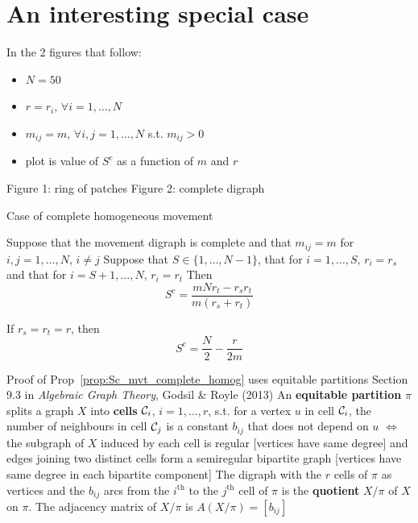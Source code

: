 \documentclass[aspectratio=169]{beamer}
\begin{document}
\section{An interesting special case}
\begin{frame}
	In the 2 figures that follow:
	\begin{itemize}
		\item $N=50$
		\item $r=r_i$, $\forall i=1,\ldots,N$
		\item $m_{ij}=m$, $\forall i,j=1,\ldots,N$ s.t. $m_{ij}>0$
		\item plot is value of $S^c$ as a function of $m$ and $r$
	\end{itemize}
	\vfill
	Figure 1: ring of patches
	\vfill
	Figure 2: complete digraph
\end{frame}



\begin{frame}{Case of complete homogeneous movement}
	\begin{proposition}\label{prop:Sc_mvt_complete_homog}
		Suppose that the movement digraph is complete and that $m_{ij}=m$ for $i,j=1,\ldots,N$, $i\neq j$
		\vskip0.2cm
		Suppose that $S\in\{1,\ldots,N-1\}$, that for $i=1,\ldots,S$, $r_i=r_s$ and that for $i=S+1,\ldots,N$, $r_i=r_t$
		\vskip0.2cm
		Then
		\begin{equation}\label{eq:Sc_mvt_complete_homog}
		S^c = \frac{mNr_t-r_sr_t}{m(r_s+r_t)}
		\end{equation}
	\end{proposition}
	\vfill
	If $r_s=r_t=r$, then
	\begin{equation}\label{eq:Sc_mvt_complete_homog_equal_r}
	S^c=\frac N2-\frac{r}{2m}
	\end{equation}
\end{frame}

	
\begin{frame}{Proof of Prop~\ref{prop:Sc_mvt_complete_homog} uses equitable partitions}
	Section 9.3 in \emph{Algebraic Graph Theory}, Godsil \& Royle (2013) 
	\vfill
	An \textbf{equitable partition} $\pi$ splits a graph $X$ into \textbf{cells} $\mathcal{C}_i$, $i=1,\ldots,r$, s.t. for a vertex $u$ in cell $\mathcal{C}_i$, the number of neighbours in cell $\mathcal{C}_j$ is a constant $b_{ij}$ that does not depend on $u$ 
	\vfill
	$\iff$ the subgraph of $X$ induced by each cell is regular [vertices have same degree] and edges joining two distinct cells form a semiregular bipartite graph [vertices have same degree in each bipartite component]
	\vfill
	The digraph with the $r$ cells of $\pi$ as vertices and the $b_{ij}$ arcs from the $i^{\textrm{th}}$ to the $j^{\textrm{th}}$ cell of $\pi$ is the \textbf{quotient} $X/\pi$ of $X$ on $\pi$. The adjacency matrix of $X/\pi$ is $A(X/\pi)=[b_{ij}]$
\end{frame}
\end{document}
